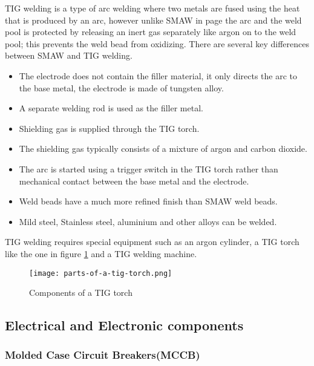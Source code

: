 \documentclass[a4paper,12pt]{article}
\begin{document}
				TIG welding is a type of arc welding where two metals are fused using the heat that is produced by an arc, however unlike SMAW in page \pageref{fig:smaw-welding-circuit} the arc and the weld pool is protected by releasing an inert gas separately like argon on to the weld pool; this prevents the weld bead from oxidizing.
						There are several key differences between SMAW and TIG welding.
						\begin{itemize}
							\item The electrode does not contain the filler material, it only directs the arc to the base metal, the electrode is made of tungsten alloy.
							\item A separate welding rod is used as the filler metal.
							\item Shielding gas is supplied through the TIG torch.
							\item The shielding gas typically consists of a mixture of argon and carbon dioxide.
							\item The arc is started using a trigger switch in the TIG torch rather than mechanical contact between the base metal and the electrode.
							\item Weld beads have a much more refined finish than SMAW weld beads.
							\item Mild steel, Stainless steel, aluminium and other alloys can be welded.
						\end{itemize}
						
						TIG welding requires special equipment such as an argon cylinder, a TIG torch like the one in figure \ref{fig:components-of-a-tig-torch} and a TIG welding machine.
						\begin{figure}[H]
							\centering				
							\texttt{[image: parts-of-a-tig-torch.png]}
							\caption{Components of a TIG torch}
							\label{fig:components-of-a-tig-torch}
						\end{figure}  
						
		\newpage		
		\subsection{Electrical and Electronic components}
				\subsubsection*{Molded Case Circuit Breakers(MCCB)}
				
\end{document}
